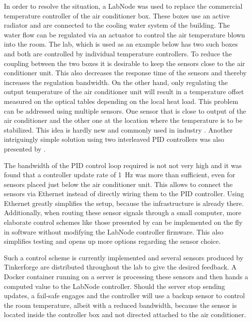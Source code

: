 In order to resolve the situation, a LabNode was used to replace the commercial temperature controller of the air conditioner box. These boxes use an active radiator and are connected to the cooling water system of the building. The water flow can be regulated via an actuator to control the air temperature blown into the room. The lab, which is used as an example below has two such boxes and both are controlled by individual temperature controllers. To reduce the coupling between the two boxes it is desirable to keep the sensors close to the air conditioner unit. This also decreases the response time of the sensors and thereby increases the regulation bandwidth. On the other hand, only regulating the output temperature of the air conditioner unit will result in a temperature offset measured on the optical tables depending on the local heat load. This problem can be addressed using multiple sensors. One sensor that is close to output of the air conditioner and the other one at the location where the temperature is to be stabilized. This idea is hardly new and commonly used in industry \cite{multi_sensor_pid}. Another intriguingly simple solution using two interleaved PID controllers was also presented by \citeauthor{split_pid} \cite{split_pid}.

The bandwidth of the PID control loop required is not not very high and it was found that a controller update rate of \qty{1}{\Hz} was more than sufficient, even for sensors placed just below the air conditioner unit. This allows to connect the sensors via Ethernet instead of directly wiring them to the PID controller. Using Ethernet greatly simplifies the setup, because the infrastructure is already there. Additionally, when routing these sensor signals through a small computer, more elaborate control schemes like those presented by \citeauthor{split_pid} \cite{split_pid} can be implemented on the fly in software without modifying the LabNode controller firmware. This also simplifies testing and opens up more options regarding the sensor choice.

Such a control scheme is currently implemented and several sensors produced by Tinkerforge are distributed throughout the lab to give the desired feedback. A Docker container running on a server is processing these sensors and then hands a computed value to the LabNode controller. Should the server stop sending updates, a fail-safe engages and the controller will use a backup sensor to control the room temperature, albeit with a reduced bandwidth, because the sensor is located inside the controller box and not directed attached to the air conditioner.

